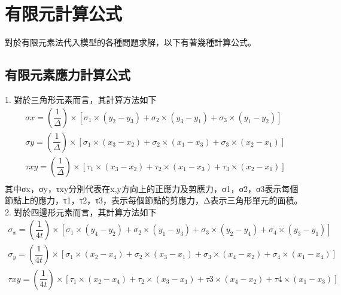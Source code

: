 \section{有限元計算公式}
對於有限元素法代入模型的各種問題求解，以下有著幾種計算公式。\\

\subsection{有限元素應力計算公式}
1. 對於三角形元素而言，其計算方法如下\\
\[
\begin{aligned}
\sigma x=\left( \dfrac{1}{\Delta }\right) \times \left[ \sigma _{1}\times \left( y_{2}-y_{3}\right) +\sigma _{2}\times \left( y_{3}-y_{1}\right) +\sigma _{3}\times \left( y_{1}-y_{2}\right) \right]\\
\sigma y=\left( \dfrac{1}{\Delta }\right) \times \left[ \sigma _{1}\times \left( x_{3}-x_{2}\right) +\sigma _{2}\times \left( x_{1}-x_{3}\right) +\sigma _{3}\times \left( x_{2}-x_{1}\right) \right]\\
\tau xy=\left( \dfrac{1}{\Delta }\right) \times \left[ \tau _{1}\times \left( x_{3}-x_{2}\right) +\tau _{2}\times \left( x_{1}-x_{3}\right) +\tau _{3}\times \left( x_{2}-x_{1}\right) \right]\\
\end{aligned}
\]
其中σx，σy，τxy分別代表在x,y方向上的正應力及剪應力，σ1，σ2，σ3表示每個節點上的應力，τ1，τ2，τ3，表示每個節點的剪應力，Δ表示三角形單元的面積。\\

2. 對於四邊形元素而言，其計算方法如下\\
\[
\begin{aligned}
\sigma _{x}=\left( \dfrac{1}{4t}\right) \times \left[ \sigma _{1}\times \left( y_{4}-y_{2}\right) +\sigma _{2}\times \left( y_{1}-y_{3}\right) +\sigma _{3}\times \left( y_{2}-y_{4}\right) +\sigma _{4}\times \left( y_{3}-y_{1}\right) \right]\\
\sigma _{y}=\left( \dfrac{1}{4t}\right) \times \left[ \sigma _{1}\times \left( x_{2}-x_{4}\right) +\sigma _{2}\times \left( x_{3}-x_{1}\right) +\sigma _{3}\times \left( x_{4}-x_{2}\right) +\sigma _{4}\times \left( x_{1}-x_{4}\right) \right]\\
\tau xy=\left( \dfrac{1}{4t}\right) \times \left[ \tau _{1}\times \left( x_{2}-x_{4}\right) +\tau _{2}\times \left( x_{3}-x_{1}\right) +\tau 3\times \left( x_{4}-x_{2}\right) +\tau 4\times \left( x_{1}-x_{3}\right) \right]\\
\end{aligned}
\]

